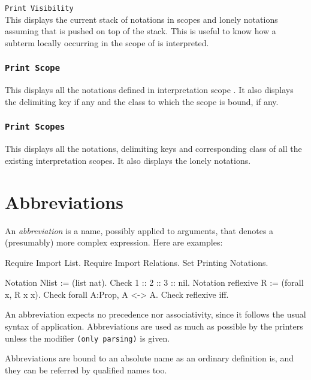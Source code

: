 \variant

{\tt Print Visibility {\scope}}\\

This displays the current stack of notations in scopes and lonely
notations assuming that {\scope} is pushed on top of the stack.  This
is useful to know how a subterm locally occurring in the scope of
{\scope} is interpreted.

\subsubsection{\tt Print Scope {\scope}}

This displays all the notations defined in interpretation scope
{\scope}.  It also displays the delimiting key if any and the class to
which the scope is bound, if any.

\subsubsection{\tt Print Scopes}

This displays all the notations, delimiting keys and corresponding
class of all the existing interpretation scopes.
It also displays the lonely notations.

\section[Abbreviations]{Abbreviations
\label{Abbreviations}
}

An {\em abbreviation} is a name, possibly applied to arguments, that
denotes a (presumably) more complex expression. Here are examples:

\begin{coq_eval}
Require Import List.
Require Import Relations.
Set Printing Notations.
\end{coq_eval}
\begin{coq_example}
Notation Nlist := (list nat).
Check 1 :: 2 :: 3 :: nil.
Notation reflexive R := (forall x, R x x).
Check forall A:Prop, A <-> A.
Check reflexive iff.
\end{coq_example}

An abbreviation expects no precedence nor associativity, since it
follows the usual syntax of application. Abbreviations are used as
much as possible by the {\Coq} printers unless the modifier
\verb=(only parsing)= is given.

Abbreviations are bound to an absolute name as an ordinary
definition is, and they can be referred by qualified names too.

